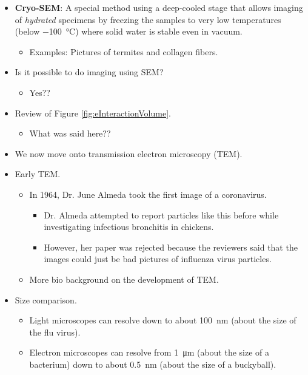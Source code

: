 \documentclass[../notes.tex]{subfiles}
\begin{document}
\begin{itemize}
\begin{itemize}
    \end{itemize}
    \item \textbf{Cryo-SEM}: A special method using a deep-cooled stage that allows imaging of \emph{hydrated} specimens by freezing the samples to very low temperatures (below \SI{-100}{\celsius}) where solid water is stable even in vacuum.
    \begin{itemize}
        \item Examples: Pictures of termites and collagen fibers.
    \end{itemize}
    \item Is it possible to do imaging using SEM?
    \begin{itemize}
        \item Yes??
    \end{itemize}
    \item Review of Figure \ref{fig:eInteractionVolume}.
    \begin{itemize}
        \item What was said here??
    \end{itemize}
    \item We now move onto transmission electron microscopy (TEM).
    \item Early TEM.
    \begin{itemize}
        \item In 1964, Dr. June Almeda took the first image of a coronavirus.
        \begin{itemize}
            \item Dr. Almeda attempted to report particles like this before while investigating infectious bronchitis in chickens.
            \item However, her paper was rejected because the reviewers said that the images could just be bad pictures of influenza virus particles.
        \end{itemize}
        \item More bio background on the development of TEM.
    \end{itemize}
    \item Size comparison.
    \begin{itemize}
        \item Light microscopes can resolve down to about \SI{100}{\nano\meter} (about the size of the flu virus).
        \item Electron microscopes can resolve from \SI{1}{\micro\meter} (about the size of a bacterium) down to about \SI{0.5}{\nano\meter} (about the size of a buckyball).

\end{itemize}
\end{itemize}
\end{document}
